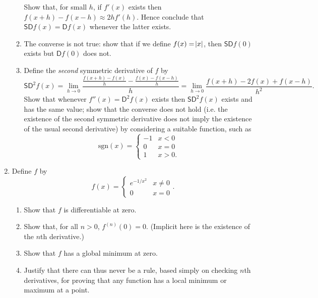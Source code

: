 \begin{enumerate}
\begin{enumerate}
            Show that, for small $ h $, if $ f'(x) $ exists then $ f(x + h) - f(x - h) \approx 2hf'(h) $. Hence
            conclude that $ \mathsf{SD}f(x) = \mathsf{D}f(x) $ whenever the latter exists.
      \item The converse is not true: show that if we define $ f(x) = \abs{x} $, then $ \mathsf{SD} f(0) $ exists
            but $ \mathsf{D} f(0) $ does not.
      \item Define the \emph{second} symmetric derivative of $ f $ by
            \begin{displaymath}
              \mathsf{SD}^2 f(x) = \lim_{h \to 0} \frac{\frac{f(x + h) - f(x)}{h} - \frac{f(x) - f(x - h)}{h}}{h} = \lim_{h \to 0} \frac{f(x + h) - 2f(x) + f(x - h)}{h^2}.
            \end{displaymath}
            Show that whenever $ f''(x) = \mathsf{D}^2 f(x) $ exists then $ \mathsf{SD}^2 f(x) $ exists and has the same value; show that the converse
            does not hold (i.e. the existence of the second symmetric derivative does not imply the existence of the usual second derivative)
            by considering a suitable function, such as
            \begin{displaymath}
              \mathrm{sgn}(x) = \begin{cases} -1 & x < 0 \\ 0 & x = 0 \\ 1 & x > 0. \end{cases}
            \end{displaymath}
    \end{enumerate}
  \item Define $ f $ by
        \begin{displaymath}
          f(x) = \begin{cases} e^{-1/x^2} & x \neq 0 \\ 0 &x = 0 \end{cases}.
        \end{displaymath}
    \begin{enumerate}
      \item Show that $ f $ is differentiable at zero.
      \item Show that, for all $ n > 0 $, $ f^{(n)}(0) = 0 $. (Implicit here is the existence of the $ n$th derivative.)
      \item Show that $ f $ has a global minimum at zero.
      \item Justify that there can thus never be a rule, based simply on checking $ n$th derivatives, for proving
            that any function has a local minimum or maximum at a point.
      \end{enumerate}
\end{enumerate}


